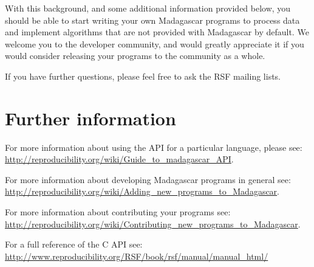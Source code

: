 With this background, and some additional information provided below, you should be able to start writing your own Madagascar programs to process data and implement algorithms that are not provided with Madagascar by default.  We welcome you to the developer community, and would greatly appreciate it if you would consider releasing your programs to the community as a whole.  

If you have further questions, please feel free to ask the RSF mailing lists.

\section{Further information}

For more information about using the API for a particular language, please see: \url{http://reproducibility.org/wiki/Guide_to_madagascar_API}.

For more information about developing Madagascar programs in general see: \url{http://reproducibility.org/wiki/Adding_new_programs_to_Madagascar}.

For more information about contributing your programs see: \url{http://reproducibility.org/wiki/Contributing_new_programs_to_Madagascar}.

For a full reference of the C API see: \url{http://www.reproducibility.org/RSF/book/rsf/manual/manual_html/}
